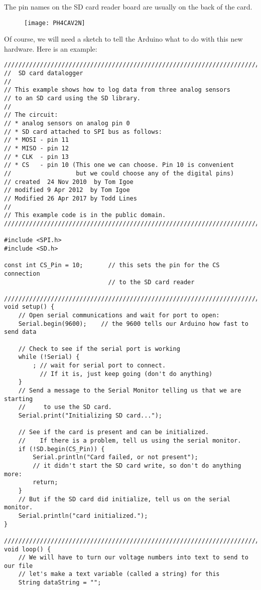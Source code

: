 The pin names on the SD card reader board are usually on the back of the
card.\begin{figure}[h!]
\texttt{[image: PH4CAV2N]}
\end{figure}Of course, we will need a sketch
to tell the Arduino what to do with this new hardware. Here is an example:
\begin{verbatim}
////////////////////////////////////////////////////////////////////////////
//  SD card datalogger
//
// This example shows how to log data from three analog sensors
// to an SD card using the SD library.
//
// The circuit:
// * analog sensors on analog pin 0
// * SD card attached to SPI bus as follows:
// * MOSI - pin 11
// * MISO - pin 12
// * CLK  - pin 13
// * CS   - pin 10 (This one we can choose. Pin 10 is convenient
//                  but we could choose any of the digital pins)
// created  24 Nov 2010  by Tom Igoe
// modified 9 Apr 2012  by Tom Igoe
// Modified 26 Apr 2017 by Todd Lines
//
// This example code is in the public domain.
////////////////////////////////////////////////////////////////////////////
 
#include <SPI.h>
#include <SD.h>
 
const int CS_Pin = 10;       // this sets the pin for the CS connection
                             // to the SD card reader
 
////////////////////////////////////////////////////////////////////////////
void setup() {
    // Open serial communications and wait for port to open:
    Serial.begin(9600);    // the 9600 tells our Arduino how fast to send data
 
    // Check to see if the serial port is working
    while (!Serial) {
        ; // wait for serial port to connect. 
          // If it is, just keep going (don't do anything)
    }
    // Send a message to the Serial Monitor telling us that we are starting
    //     to use the SD card.
    Serial.print("Initializing SD card...");
 
    // See if the card is present and can be initialized.
    //    If there is a problem, tell us using the serial monitor.
    if (!SD.begin(CS_Pin)) {
        Serial.println("Card failed, or not present");
        // it didn't start the SD card write, so don't do anything more:
        return;
    }
    // But if the SD card did initialize, tell us on the serial monitor.
    Serial.println("card initialized.");
}
 
////////////////////////////////////////////////////////////////////////////
void loop() {
    // We will have to turn our voltage numbers into text to send to our file
    // let's make a text variable (called a string) for this
    String dataString = ""; 
 

\end{verbatim}
